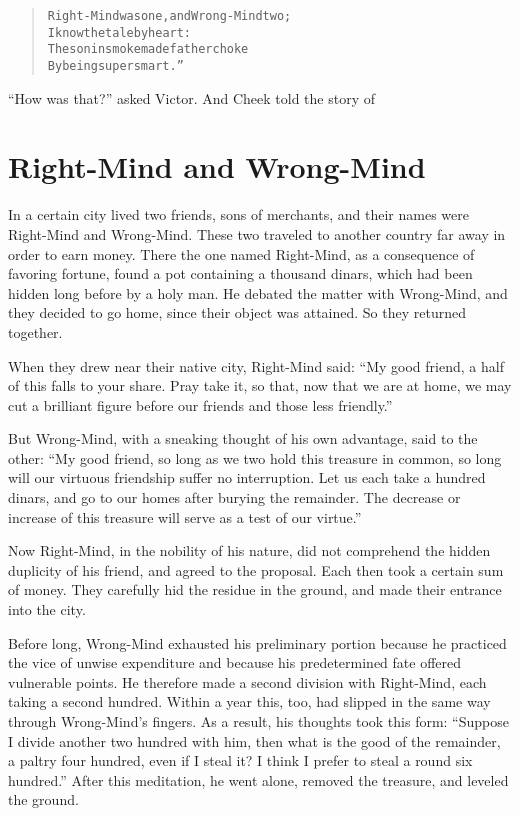 \documentclass[article, twoside, 14pt]{memoir}
\renewenvironment{verbatim}{%
\begin{quote}%
\vskip -10pt%
\begin{alltt}\normalfont\large}{\end{alltt}%
\end{quote}%
\vskip -10pt
} %
\begin{document}
\begin{verbatim}
Right-Mind was one, and Wrong-Mind two;
    I know the tale by heart:
The son in smoke made father choke
    By being supersmart.”
\end{verbatim}
``How was that?'' asked Victor. And Cheek told the story of

\chapter{Right-Mind and Wrong-Mind}

\label{s29}

In a certain city lived two friends, sons of merchants, and their
names were Right-Mind and Wrong-Mind. These two traveled to another
country far away in order to earn money. There the one named
Right-Mind, as a consequence of favoring fortune, found a pot
containing a thousand dinars, which had been hidden long before by
a holy man. He debated the matter with Wrong-Mind, and they decided
to go home, since their object was attained. So they returned
together.

When they drew near their native city, Right-Mind said:
``My good friend, a half of this falls to your share. Pray take it, so that, now that we are at home, we may cut a brilliant figure before our friends and those less friendly.''

But Wrong-Mind, with a sneaking thought of his own advantage, said
to the other:
``My good friend, so long as we two hold this treasure in common, so long will our virtuous friendship suffer no interruption. Let us each take a hundred dinars, and go to our homes after burying the remainder. The decrease or increase of this treasure will serve as a test of our virtue.''

Now Right-Mind, in the nobility of his nature, did not comprehend
the hidden duplicity of his friend, and agreed to the proposal.
Each then took a certain sum of money. They carefully hid the
residue in the ground, and made their entrance into the city.

Before long, Wrong-Mind exhausted his preliminary portion
because he practiced the vice of unwise expenditure and because his
predetermined fate offered vulnerable points. He therefore made a
second division with Right-Mind, each taking a second hundred.
Within a year this, too, had slipped in the same way through
Wrong-Mind's fingers. As a result, his thoughts took this form:
``Suppose I divide another two hundred with him, then what is the good of the remainder, a paltry four hundred, even if I steal it? I think I prefer to steal a round six hundred.''
After this meditation, he went alone, removed the treasure, and
leveled the ground.
\end{document}

